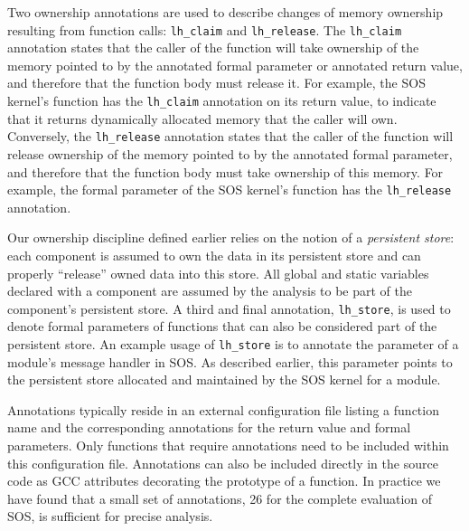 Two ownership annotations are used to describe changes of memory ownership
resulting from function calls: {\tt lh\_claim} and {\tt lh\_release}.
%
The {\tt lh\_claim} annotation states that the caller of the function
will take ownership of the memory pointed to by the annotated formal
parameter or annotated return value, and therefore that the function
body must release it.
For example, the SOS kernel's
 function has the {\tt lh\_claim} annotation on its
return value, to indicate that it returns dynamically allocated memory
that the caller will own.
%
Conversely, the {\tt lh\_release} annotation states that the caller of
the function will release ownership of 
the memory pointed to by the annotated formal parameter,
and therefore that the function body must take ownership of this memory.
For example, the formal parameter of the SOS kernel's 
function has the {\tt lh\_release} annotation.
%

Our ownership discipline defined earlier relies 
on the notion of a {\em persistent
store}:  each component is assumed to own the data in its persistent
store and can properly ``release'' owned data into this store.
%
All global and static variables declared with a component 
are assumed by the analysis to be part
of the component's persistent store.
%
A third and final annotation, {\tt lh\_store}, is used to denote formal
parameters of functions that can also be considered part of the
persistent store.
%
An example usage of {\tt lh\_store} is to annotate 
the  parameter of a
module's message handler in SOS.
%
As described earlier, 
this parameter points to the persistent store allocated and
maintained by the SOS kernel for a module.


Annotations typically reside in an external configuration file listing
a function name and the corresponding annotations for the return value
and formal parameters.
%
Only functions that require annotations need to be included within
this configuration file.
%
Annotations can also be included directly in the source code as GCC
attributes decorating the prototype of a function.
%
%
In practice we have found that a small set of annotations, 26 for the
complete evaluation of SOS, is sufficient for precise
analysis. 

